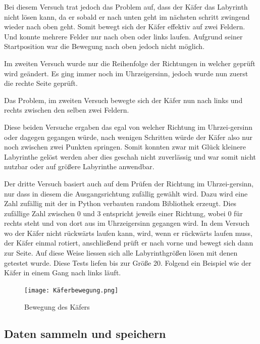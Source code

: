 \documentclass[12pt, a4paper, titlepage]{article}
\begin{document}
Bei diesem Versuch trat jedoch das Problem auf, dass der Käfer das Labyrinth nicht lösen kann, da er sobald er nach unten geht im nächsten schritt zwingend wieder nach oben geht.
Somit bewegt sich der Käfer effektiv auf zwei Feldern.
Und konnte mehrere Felder nur nach oben oder links laufen.
Aufgrund seiner Startposition war die Bewegung nach oben jedoch nicht möglich.

\bigskip

Im zweiten Versuch wurde nur die Reihenfolge der Richtungen in welcher geprüft wird geändert.
Es ging immer noch im Uhrzeigersinn, jedoch wurde nun zuerst die rechte Seite geprüft.

Das Problem, im zweiten Versuch bewegte sich der Käfer nun nach links und rechts zwischen den selben zwei Feldern.


\bigskip

Diese beiden Versuche ergaben das egal von welcher Richtung im Uhrzei-gersinn oder dagegen gegangen würde, nach wenigen Schritten würde der Käfer also nur noch zwischen zwei Punkten springen.
Somit konnten zwar mit Glück kleinere Labyrinthe gelöst werden aber dies geschah nicht zuverlässig und war somit nicht nutzbar oder auf größere Labyrinthe anwendbar.

\bigskip

Der dritte Versuch basiert auch auf dem Prüfen der Richtung im Uhrzei-gersinn, nur dass in diesem die Ausgangsrichtung zufällig gewählt wird.
Dazu wird eine Zahl zufällig mit der in Python verbauten random Bibliothek erzeugt.
Dies zufällige Zahl zwischen 0 und 3 entspricht jeweils einer Richtung, wobei 0 für rechts steht und von dort aus im Uhrzeigersinn gegangen wird.
In dem Versuch wo der Käfer nicht rückwärts laufen kann, wird, wenn er rückwärts laufen muss, der Käfer einmal rotiert, anschließend prüft er nach vorne und bewegt sich dann zur Seite.
Auf diese Weise liessen sich alle Labyrinthgrößen lösen mit denen getestet wurde.
Diese Tests liefen bis zur Größe 20.
Folgend ein Beispiel wie der Käfer in einem Gang nach links läuft.

 
\begin{figure}[h]
	\centering
	\texttt{[image: Käferbewegung.png]}
	\caption{Bewegung des Käfers}
	\label{fig: Käferbewegung}
\end{figure}

\subsection{Daten sammeln und speichern}
\end{document}
